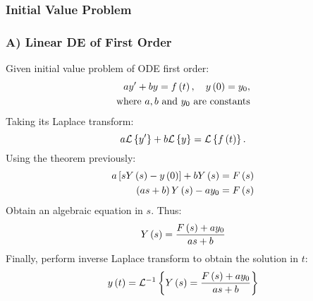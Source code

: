 \subsubsection{Initial Value Problem}
\subsubsection*{A) Linear DE of First Order}
Given initial value problem of ODE first order:
\begin{align}
    ay'+by=f\left(t\right),\quad y\left(0\right)=y_0,\\
    \text{where }a,b\text{ and }y_0\text{ are constants}\nonumber
\end{align}
Taking its Laplace transform:
\begin{equation}
    a\mathcal{L}\left\{y'\right\}+b\mathcal{L}\left\{y\right\}=\mathcal{L}\left\{f\left(t\right)\right\}.
\end{equation}
Using the theorem previously:
\begin{align*}
    a\left[sY\left(s\right)-y\left(0\right)\right]+bY\left(s\right)&=F\left(s\right)\\
    \left(as+b\right)Y\left(s\right)-ay_0&=F\left(s\right)
\end{align*}
Obtain an algebraic equation in $s$. Thus:
\begin{equation}
    Y\left(s\right)=\frac{F\left(s\right)+ay_0}{as+b}
\end{equation}
Finally, perform inverse Laplace transform to obtain the solution in $t$:
\begin{equation}
    y\left(t\right)=\mathcal{L}^{-1}\left\{Y\left(s\right)=\frac{F\left(s\right)+ay_0}{as+b}\right\}
\end{equation}
